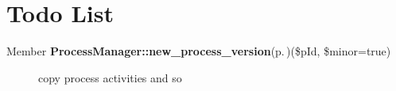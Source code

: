 \section{Todo List}\label{todo}
\label{_todo000001}
 \begin{description}
\item[Member {\bf Process\-Manager::new\_\-process\_\-version}{\rm (p.\,\pageref{classProcessManager_a6})}(\$p\-Id, \$minor=true) ]copy process activities and so \end{description}
